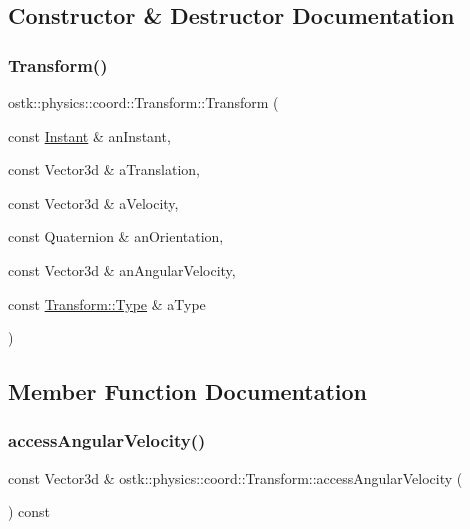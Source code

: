\subsection{Constructor \& Destructor Documentation}
\mbox{\label{classostk_1_1physics_1_1coord_1_1_transform_a2117020ea022e73d64f7e4ac0c88ac46}} 
\subsubsection{\texorpdfstring{Transform()}{Transform()}}
{\footnotesize\ttfamily ostk\+::physics\+::coord\+::\+Transform\+::\+Transform (\begin{DoxyParamCaption}\item[{const \hyperlink{classostk_1_1physics_1_1time_1_1_instant}{Instant} \&}]{an\+Instant,  }\item[{const Vector3d \&}]{a\+Translation,  }\item[{const Vector3d \&}]{a\+Velocity,  }\item[{const Quaternion \&}]{an\+Orientation,  }\item[{const Vector3d \&}]{an\+Angular\+Velocity,  }\item[{const \hyperlink{classostk_1_1physics_1_1coord_1_1_transform_a4325aff71186125b3ca8604247f55215}{Transform\+::\+Type} \&}]{a\+Type }\end{DoxyParamCaption})}



\subsection{Member Function Documentation}
\mbox{\label{classostk_1_1physics_1_1coord_1_1_transform_ae344e90f3419630a16d413224675a003}} 
\subsubsection{\texorpdfstring{access\+Angular\+Velocity()}{accessAngularVelocity()}}
{\footnotesize\ttfamily const Vector3d \& ostk\+::physics\+::coord\+::\+Transform\+::access\+Angular\+Velocity (\begin{DoxyParamCaption}{ }\end{DoxyParamCaption}) const}

